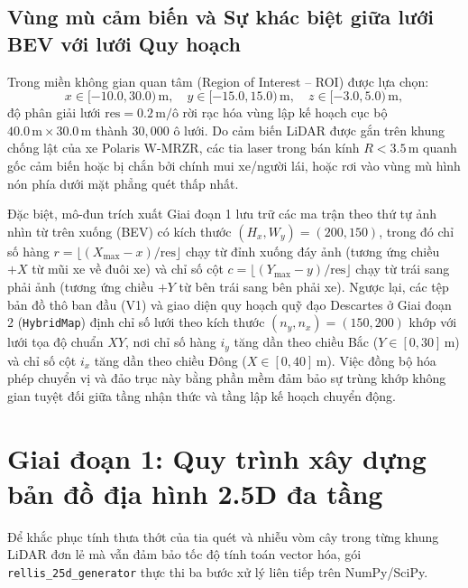 \documentclass[a4paper,fleqn]{cas-sc}
\begin{document}
\subsection{Vùng mù cảm biến và Sự khác biệt giữa lưới BEV với lưới Quy hoạch}
\label{subsec:coords}
Trong miền không gian quan tâm (Region of Interest -- ROI) được lựa chọn:
\begin{equation}
    x \in [-10.0, 30.0)\,\text{m}, \quad y \in [-15.0, 15.0)\,\text{m}, \quad z \in [-3.0, 5.0)\,\text{m},
\end{equation}
độ phân giải lưới $\text{res} = 0.2\,\text{m/ô}$ rời rạc hóa vùng lập kế hoạch cục bộ $40.0\,\text{m} \times 30.0\,\text{m}$ thành $30{,}000$ ô lưới. Do cảm biến LiDAR được gắn trên khung chống lật của xe Polaris W-MRZR, các tia laser trong bán kính $R < 3.5\,\text{m}$ quanh gốc cảm biến hoặc bị chắn bởi chính mui xe/người lái, hoặc rơi vào vùng mù hình nón phía dưới mặt phẳng quét thấp nhất.

Đặc biệt, mô-đun trích xuất Giai đoạn 1 lưu trữ các ma trận theo thứ tự ảnh nhìn từ trên xuống (BEV) có kích thước $(H_x, W_y) = (200, 150)$, trong đó chỉ số hàng $r = \lfloor (X_{\max} - x)/\text{res} \rfloor$ chạy từ đỉnh xuống đáy ảnh (tương ứng chiều $+X$ từ mũi xe về đuôi xe) và chỉ số cột $c = \lfloor (Y_{\max} - y)/\text{res} \rfloor$ chạy từ trái sang phải ảnh (tương ứng chiều $+Y$ từ bên trái sang bên phải xe). Ngược lại, các tệp bản đồ thô ban đầu (V1) và giao diện quy hoạch quỹ đạo Descartes ở Giai đoạn 2 (\texttt{HybridMap}) định chỉ số lưới theo kích thước $(n_y, n_x) = (150, 200)$ khớp với lưới tọa độ chuẩn $XY$, nơi chỉ số hàng $i_y$ tăng dần theo chiều Bắc ($Y \in [0, 30]\,\text{m}$) và chỉ số cột $i_x$ tăng dần theo chiều Đông ($X \in [0, 40]\,\text{m}$). Việc đồng bộ hóa phép chuyển vị và đảo trục này bằng phần mềm đảm bảo sự trùng khớp không gian tuyệt đối giữa tầng nhận thức và tầng lập kế hoạch chuyển động.

\section{Giai đoạn 1: Quy trình xây dựng bản đồ địa hình 2.5D đa tầng}
\label{sec:phase1}

Để khắc phục tính thưa thớt của tia quét và nhiễu vòm cây trong từng khung LiDAR đơn lẻ mà vẫn đảm bảo tốc độ tính toán vector hóa, gói \texttt{rellis\_25d\_generator} thực thi ba bước xử lý liên tiếp trên NumPy/SciPy.
\end{document}
